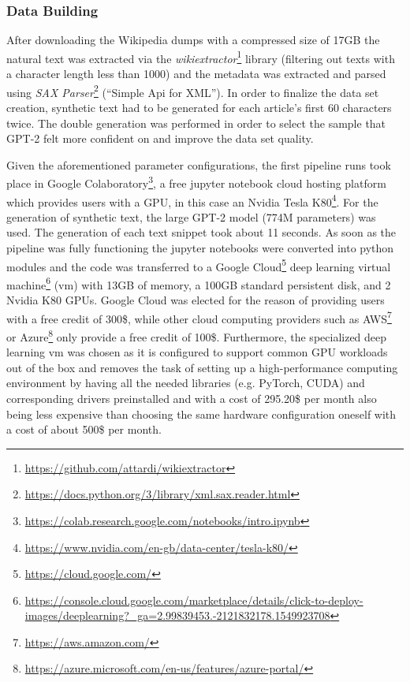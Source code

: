 \subsubsection{Data Building}
\label{sub:data_building}

After downloading the Wikipedia dumps with a compressed size of 17GB the natural text was extracted via the \textit{wikiextractor}\footnote{\url{https://github.com/attardi/wikiextractor}} library (filtering out texts with a character length less than 1000) and the metadata was extracted and parsed using \textit{SAX Parser}\footnote{\url{https://docs.python.org/3/library/xml.sax.reader.html}} (“Simple Api for XML”). In order to finalize the data set creation, synthetic text had to be generated for each article’s first 60 characters twice.
The double generation was performed in order to select the sample that GPT-2 felt more confident on and improve the data set quality.

Given the aforementioned parameter configurations, the first pipeline runs took place in Google Colaboratory\footnote{\url{https://colab.research.google.com/notebooks/intro.ipynb}}, a free jupyter notebook cloud hosting platform which provides users with a GPU, in this case an Nvidia Tesla K80\footnote{\url{https://www.nvidia.com/en-gb/data-center/tesla-k80/}}. For the generation of synthetic text, the large GPT-2 model (774M parameters) was used. The generation of each text snippet took about 11 seconds. As soon as the pipeline was fully functioning the jupyter notebooks were converted into python modules and the code was transferred to a Google Cloud\footnote{\url{https://cloud.google.com/}} deep learning virtual machine\footnote{\url{https://console.cloud.google.com/marketplace/details/click-to-deploy-images/deeplearning?_ga=2.99839453.-2121832178.1549923708}} (vm) with 13GB of memory, a 100GB standard persistent disk, and 2 Nvidia K80 GPUs. Google Cloud was elected for the reason of providing users with a free credit of 300\$, while other cloud computing providers such as AWS\footnote{\url{https://aws.amazon.com/}} or Azure\footnote{\url{https://azure.microsoft.com/en-us/features/azure-portal/}} only provide a free credit of 100\$. Furthermore, the specialized deep learning vm was chosen as it is configured to support common GPU workloads out of the box and removes the task of setting up a high-performance computing environment by having all the needed libraries (e.g. PyTorch, CUDA) and corresponding drivers preinstalled and with a cost of 295.20\$ per month also being less expensive than choosing the same hardware configuration oneself with a cost of about 500\$ per month.

